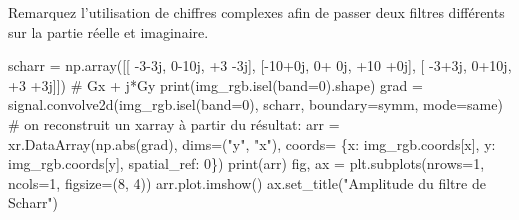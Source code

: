 \documentclass[
  french,
  11pt,
  letterpaper,
  open=any,
  twoside=false,
  french]{scrbook}
\newenvironment{Shaded}{\begin{snugshade}}{\end{snugshade}}
\newcommand{\BuiltInTok}[1]{\textcolor[rgb]{0.00,0.23,0.31}{#1}}
\newcommand{\CommentTok}[1]{\textcolor[rgb]{0.37,0.37,0.37}{#1}}
\newcommand{\DecValTok}[1]{\textcolor[rgb]{0.68,0.00,0.00}{#1}}
\newcommand{\NormalTok}[1]{\textcolor[rgb]{0.00,0.23,0.31}{#1}}
\newcommand{\OperatorTok}[1]{\textcolor[rgb]{0.37,0.37,0.37}{#1}}
\newcommand{\OtherTok}[1]{\textcolor[rgb]{0.00,0.23,0.31}{#1}}
\newcommand{\StringTok}[1]{\textcolor[rgb]{0.13,0.47,0.30}{#1}}
\begin{document}
Remarquez l'utilisation de chiffres complexes afin de passer deux
filtres différents sur la partie réelle et imaginaire.

\begin{Shaded}
\begin{Highlighting}[]
\NormalTok{scharr }\OperatorTok{=}\NormalTok{ np.array([[ }\OperatorTok{{-}}\DecValTok{3}\OperatorTok{{-}}\OtherTok{3j}\NormalTok{, }\DecValTok{0}\OperatorTok{{-}}\OtherTok{10j}\NormalTok{,  }\OperatorTok{+}\DecValTok{3} \OperatorTok{{-}}\OtherTok{3j}\NormalTok{],}
\NormalTok{                   [}\OperatorTok{{-}}\DecValTok{10}\OperatorTok{+}\OtherTok{0j}\NormalTok{, }\DecValTok{0}\OperatorTok{+} \OtherTok{0j}\NormalTok{, }\OperatorTok{+}\DecValTok{10} \OperatorTok{+}\OtherTok{0j}\NormalTok{],}
\NormalTok{                   [ }\OperatorTok{{-}}\DecValTok{3}\OperatorTok{+}\OtherTok{3j}\NormalTok{, }\DecValTok{0}\OperatorTok{+}\OtherTok{10j}\NormalTok{,  }\OperatorTok{+}\DecValTok{3} \OperatorTok{+}\OtherTok{3j}\NormalTok{]]) }\CommentTok{\# Gx + j*Gy}
\BuiltInTok{print}\NormalTok{(img\_rgb.isel(band}\OperatorTok{=}\DecValTok{0}\NormalTok{).shape)}
\NormalTok{grad }\OperatorTok{=}\NormalTok{ signal.convolve2d(img\_rgb.isel(band}\OperatorTok{=}\DecValTok{0}\NormalTok{), scharr, boundary}\OperatorTok{=}\StringTok{\textquotesingle{}symm\textquotesingle{}}\NormalTok{, mode}\OperatorTok{=}\StringTok{\textquotesingle{}same\textquotesingle{}}\NormalTok{)}
\CommentTok{\# on reconstruit un xarray à partir du résultat:}
\NormalTok{arr }\OperatorTok{=}\NormalTok{ xr.DataArray(np.}\BuiltInTok{abs}\NormalTok{(grad), dims}\OperatorTok{=}\NormalTok{(}\StringTok{"y"}\NormalTok{, }\StringTok{"x"}\NormalTok{), coords}\OperatorTok{=}\NormalTok{ \{}\StringTok{\textquotesingle{}x\textquotesingle{}}\NormalTok{: img\_rgb.coords[}\StringTok{\textquotesingle{}x\textquotesingle{}}\NormalTok{], }\StringTok{\textquotesingle{}y\textquotesingle{}}\NormalTok{: img\_rgb.coords[}\StringTok{\textquotesingle{}y\textquotesingle{}}\NormalTok{], }\StringTok{\textquotesingle{}spatial\_ref\textquotesingle{}}\NormalTok{: }\DecValTok{0}\NormalTok{\})}
\BuiltInTok{print}\NormalTok{(arr)}
\NormalTok{fig, ax }\OperatorTok{=}\NormalTok{ plt.subplots(nrows}\OperatorTok{=}\DecValTok{1}\NormalTok{, ncols}\OperatorTok{=}\DecValTok{1}\NormalTok{, figsize}\OperatorTok{=}\NormalTok{(}\DecValTok{8}\NormalTok{, }\DecValTok{4}\NormalTok{))}
\NormalTok{arr.plot.imshow()}
\NormalTok{ax.set\_title(}\StringTok{"Amplitude du filtre de Scharr"}\NormalTok{)}
\end{Highlighting}
\end{Shaded}
\end{document}
